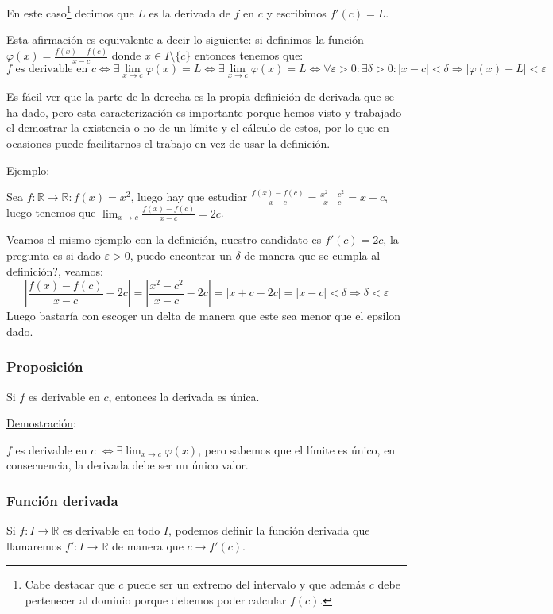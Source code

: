 \documentclass[10pt,a4paper,openright]{book}
\begin{document}
En este caso\footnote{Cabe destacar que $c$ puede ser un extremo del intervalo y que además $c$ debe pertenecer al dominio porque debemos poder calcular $f(c)$.} decimos que $L$ es la derivada de $f$ en $c$ y escribimos $f'(c)=L$.

Esta afirmación es equivalente a decir lo siguiente: si definimos la función $\varphi(x) = \frac{f(x)-f(c)}{x-c}$ donde $x\in I\mbox{\textbackslash}\{c\}$ entonces tenemos que:
$$f\mbox{ es derivable en }c\Leftrightarrow \exists \lim_{x\rightarrow c}\varphi(x) = L\Leftrightarrow\exists \lim_{x\rightarrow c}\varphi(x) = L \Leftrightarrow \forall \varepsilon>0 : \exists \delta>0 : |x-c|<\delta\Rightarrow |\varphi(x)-L|<\varepsilon$$

Es fácil ver que la parte de la derecha es la propia definición de derivada que se ha dado, pero esta caracterización es importante porque hemos visto y trabajado el demostrar la existencia o no de un límite y el cálculo de estos, por lo que en ocasiones puede facilitarnos el trabajo en vez de usar la definición.

\underline{Ejemplo:}\par
Sea $f: \mathbb R \rightarrow \mathbb R: f(x)=x^2$, luego hay que estudiar $\frac{f(x)-f(c)}{x-c} = \frac{x^2- c^2}{x-c}= x+c$, luego tenemos que $\lim_{x\rightarrow c} \frac{f(x)-f(c)}{x-c}= 2c$.\par
Veamos el mismo ejemplo con la definición, nuestro candidato es $f'(c)=2c$, la pregunta es si dado $\varepsilon>0$, puedo encontrar un $\delta$ de manera que se cumpla al definición?, veamos:
$$\left|\frac{f(x)-f(c)}{x-c}-2c\right| = \left|\frac{x^2-c^2}{x-c}-2c\right| = |x+c-2c|= |x-c|<\delta \Rightarrow \delta <\varepsilon$$
Luego bastaría con escoger un delta de manera que este sea menor que el epsilon dado.

\subsubsection*{Proposición}
Si $f$ es derivable en $c$, entonces la derivada es única.

\underline{Demostración}:\par
$f$ es derivable en $c$ $\Leftrightarrow \exists \lim_{x\rightarrow c}\varphi(x) $, pero sabemos que el límite es único, en consecuencia, la derivada debe ser un único valor.

\subsubsection*{Función derivada}
Si $f:I\rightarrow \mathbb R$ es derivable en todo $I$, podemos definir la función derivada que llamaremos $f': I\rightarrow \mathbb R$ de manera que $c\rightarrow f'(c)$.
\end{document}
